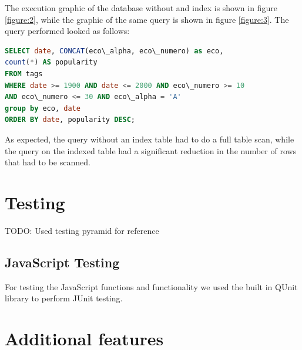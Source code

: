 \documentclass{article}
\begin{document}
The execution graphic of the database without and index is shown in figure
\ref{figure:2}, while the graphic of the same query is shown in figure
\ref{figure:3}. The query performed looked as follows:

\begin{lstlisting}[language=sql, frame=single]
SELECT date, CONCAT(eco\_alpha, eco\_numero) as eco,
count(*) AS popularity
FROM tags
WHERE date >= 1900 AND date <= 2000 AND eco\_numero >= 10
AND eco\_numero <= 30 AND eco\_alpha = 'A'
group by eco, date
ORDER BY date, popularity DESC;
\end{lstlisting}

As expected, the query without an index table had to do a full table scan,
while the query on the indexed table had a significant reduction in the
number of rows that had to be scanned.

\section{Testing}
TODO: Used testing pyramid for reference \cite{test}
\subsection{JavaScript Testing}
For testing the JavaScript functions and functionality we used the built
in QUnit library to perform JUnit testing.

\section{Additional features}



\end{document}
